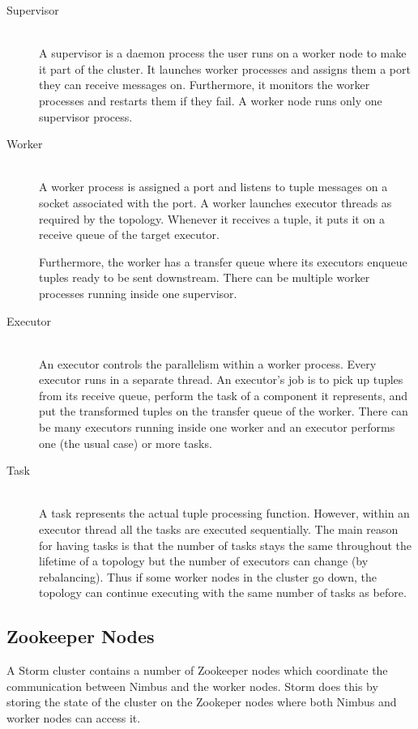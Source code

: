 \documentclass[bsc,deptreport,twoside,singlespacing,normalheadings,parskip]{infthesis}\usepackage[]{graphicx}\usepackage[]{color}
\begin{document}
\begin{description}
	\item[Supervisor] \hfill \\
	A supervisor is a daemon process the user runs on a worker node to make it part of the cluster. It launches worker processes and assigns them a port they can receive messages on. Furthermore, it monitors the worker processes and restarts them if they fail. A worker node runs only one supervisor process.
	\item[Worker] \hfill \\
	A worker process is assigned a port and listens to tuple messages on a socket associated with the port. A worker launches executor threads as required by the topology. Whenever it receives a tuple, it puts it on a receive queue of the target executor.
	
	Furthermore, the worker has a transfer queue where its executors enqueue tuples ready to be sent downstream. There can be multiple worker processes running inside one supervisor.
	\item[Executor] \hfill \\
	An executor controls the parallelism within a worker process. Every executor runs in a separate thread. An executor's job is to pick up tuples from its receive queue, perform the task of a component it represents, and put the transformed tuples on the transfer queue of the worker. There can be many executors running inside one worker and an executor performs one (the usual case) or more tasks.
	\item[Task] \hfill \\
	A task represents the actual tuple processing function. However, within an executor thread all the tasks are executed sequentially. The main reason for having tasks is that the number of tasks stays the same throughout the lifetime of a topology but the number of executors can change (by rebalancing). Thus if some worker nodes in the cluster go down, the topology can continue executing with the same number of tasks as before.
\end{description}

\subsection{Zookeeper Nodes}
\label{subsec:zookeeper}

A Storm cluster contains a number of Zookeeper nodes which coordinate the communication between Nimbus and the worker nodes. Storm does this by storing the state of the cluster on the Zookeper nodes where both Nimbus and worker nodes can access it.
\end{document}

